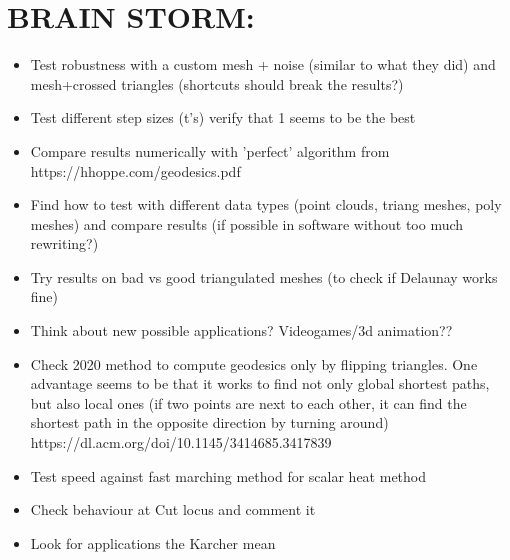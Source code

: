 \documentclass[sigconf]{acmart}
\begin{document}
\section{BRAIN STORM:}
\begin{itemize}
  \item Test robustness with a custom mesh + noise (similar to what they did) and mesh+crossed triangles (shortcuts should break the results?)
  \item Test different step sizes (t's) verify that 1 seems to be the best
  \item Compare results numerically with 'perfect' algorithm from https://hhoppe.com/geodesics.pdf
  \item Find how to test with different data types (point clouds, triang meshes, poly meshes) and compare results (if possible in software without too much rewriting?)
  \item Try results on bad vs good triangulated meshes (to check if Delaunay works fine)
  \item Think about new possible applications? Videogames/3d animation?? 
  \item Check 2020 method to compute geodesics only by flipping triangles. One advantage seems to be that it works to find not only global shortest paths, but also local ones (if two points are next to each other, it can find the shortest path in the opposite direction by turning around)  https://dl.acm.org/doi/10.1145/3414685.3417839
  \item Test speed against fast marching method for scalar heat method
  \item Check behaviour at Cut locus and comment it
  \item Look for applications the Karcher mean
\end{itemize}



\end{document}
